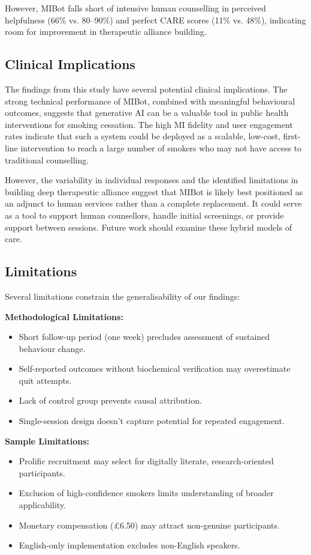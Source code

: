 However, MIBot falls short of intensive human counselling in perceived helpfulness (66\% vs. 80--90\%) and perfect CARE scores (11\% vs. 48\%), indicating room for improvement in therapeutic alliance building.

\subsection*{Clinical Implications}

The findings from this study have several potential clinical implications. The strong technical performance of MIBot, combined with meaningful behavioural outcomes, suggests that generative AI can be a valuable tool in public health interventions for smoking cessation. The high MI fidelity and user engagement rates indicate that such a system could be deployed as a scalable, low-cost, first-line intervention to reach a large number of smokers who may not have access to traditional counselling.

However, the variability in individual responses and the identified limitations in building deep therapeutic alliance suggest that MIBot is likely best positioned as an adjunct to human services rather than a complete replacement. It could serve as a tool to support human counsellors, handle initial screenings, or provide support between sessions. Future work should examine these hybrid models of care.

\subsection*{Limitations}

Several limitations constrain the generalisability of our findings:

\textbf{Methodological Limitations:}
\begin{itemize}
	\item Short follow-up period (one week) precludes assessment of sustained behaviour change.
	\item Self-reported outcomes without biochemical verification may overestimate quit attempts.
	\item Lack of control group prevents causal attribution.
	\item Single-session design doesn't capture potential for repeated engagement.
\end{itemize}

\textbf{Sample Limitations:}
\begin{itemize}
	\item Prolific recruitment may select for digitally literate, research-oriented participants.
	\item Exclusion of high-confidence smokers limits understanding of broader applicability.
	\item Monetary compensation (£6.50) may attract non-genuine participants.
	\item English-only implementation excludes non-English speakers.
\end{itemize}

